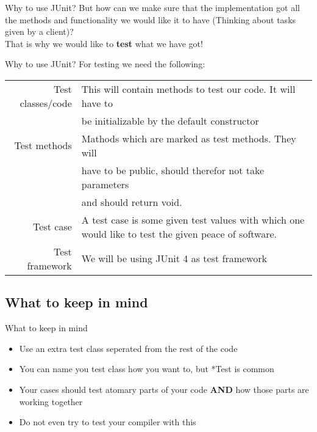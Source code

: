 \begin{frame}{Why to use JUnit?}
	\large But how can we make sure that the implementation got all the methods and functionality we would like it to have (Thinking about tasks given by a client)?\\\vspace{0.5cm}
	\pause
	That is why we would like to \textbf{test} what we have got!
\end{frame}

\begin{frame}{Why to use JUnit?}
	For testing we need the following:
	
	\vspace{0.25cm}\begin{tabular}{rl}
		Test classes/code& This will contain methods to test our code. It will have to\\& be initializable by the default constructor\vspace{0.25cm}\\
		Test methods& Mathods which are marked as test methods. They will\\& have to be public, should therefor not take parameters\\& and should return void.\vspace{0.25cm}\\\vspace{0.25cm}
		Test case& A test case is some given test values with which one would like to test the given peace of software.\\\vspace{0.25cm}
		Test framework& We will be using JUnit 4 as test framework
	\end{tabular}
\end{frame}

\subsection{What to keep in mind}
\begin{frame}{What to keep in mind}
	\begin{itemize}
		\item Use an extra test class seperated from the rest of the code
		\item You can name you test class how you want to, but *Test is common
		\item Your cases should test atomary parts of your code \textbf{AND} how those parts are working together
		\item Do not even try to test your compiler with this
	\end{itemize}
\end{frame}


